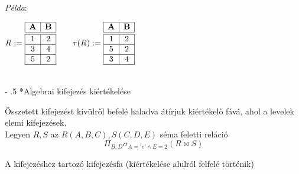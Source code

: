 \documentclass[tikz,12pt,margin=0px]{article}
\makeatletter
\renewcommand\paragraph{%
	\@startsection{paragraph}{4}{0mm}%
	{-\baselineskip}%
	{.5\baselineskip}%
	{\normalfont\normalsize\bfseries}}
\makeatother
\begin{document}
    \noindent \textit{Példa}:

    \begin{center}
        $R := \begin{array}{|c|c|}
                \hline
                \textbf{A} & \textbf{B} \\ \hline \hline
                1 & 2  \\ \hline
                3 & 4 \\ \hline
                5 & 2 \\ \hline
            \end{array} \qquad \tau(R) :=
            \begin{array}{|c|c|}
                \hline
                \textbf{A} & \textbf{B} \\ \hline \hline
                1 & 2  \\ \hline
                5 & 2 \\ \hline
                3 & 4 \\ \hline
        \end{array}$
    \end{center}

    \ \\

	\paragraph*{Algebrai kifejezés kiértékelése\\}

    \noindent Összetett kifejezést kívülről befelé haladva átírjuk kiértékelő fává, ahol a levelek elemi kifejezések.\\

    \noindent Legyen $R, S$ az $R(A, B, C), S(C, D, E)$ séma feletti reláció
    \[
        \Pi_{B,D}\sigma_{A = 'c' \wedge E = 2}(R \bowtie S)
    \]

    \noindent A kifejezéshez tartozó kifejezésfa (kiértékelése alulról felfelé történik)

    \begin{center}
    \end{center}
\end{document}
